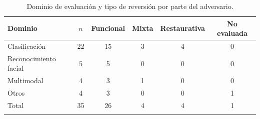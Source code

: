 \documentclass[pdflatex,sn-mathphys-num]{sn-jnl}
\theoremstyle{thmstyleone}
\theoremstyle{thmstyletwo}
\theoremstyle{thmstylethree}
\begin{document}
\begin{table}[h]
\centering
\caption{Dominio de evaluación y tipo de reversión por parte del adversario.}\label{tab:rq7}
\footnotesize
\begin{tabular}{@{}lccccc@{}}
\toprule
Dominio & $n$ & Funcional & Mixta & Restaurativa & No evaluada \\
\midrule
Clasificación & 22 & 15 & 3 & 4 & 0 \\
Reconocimiento facial & 5 & 5 & 0 & 0 & 0 \\
Multimodal & 4 & 3 & 1 & 0 & 0 \\
Otros & 4 & 3 & 0 & 0 & 1 \\
\midrule
Total & 35 & 26 & 4 & 4 & 1 \\
\botrule
\end{tabular}
\end{table}
\end{document}
